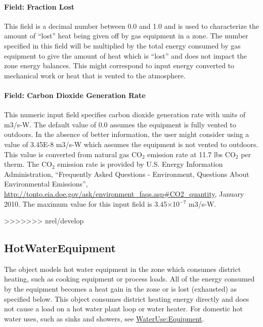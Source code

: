 \paragraph{Field: Fraction Lost}\label{field-fraction-lost-1-gas-definition}

This field is a decimal number between 0.0 and 1.0 and is used to characterize the amount of ``lost'' heat being given off by gas equipment in a zone. The number specified in this field will be multiplied by the total energy consumed by gas equipment to give the amount of heat which is ``lost'' and does not impact the zone energy balances. This might correspond to input energy converted to mechanical work or heat that is vented to the atmosphere.

\paragraph{Field: Carbon Dioxide Generation Rate}\label{field-carbon-dioxide-generation-rate-1-gas-definition}

This numeric input field specifies carbon dioxide generation rate with units of m3/s-W. The default value of 0.0 assumes the equipment is fully vented to outdoors. In the absence of better information, the user might consider using a value of 3.45E-8 m3/s-W which assumes the equipment is not vented to outdoors. This value is converted from natural gas CO\(_{2}\) emission rate at 11.7 lbs CO\(_{2}\) per therm. The CO\(_{2}\) emission rate is provided by U.S. Energy Information Administration, ``Frequently Asked Questions - Environment, Questions About Environmental Emissions'', \url{http://tonto.eia.doe.gov/ask/environment_faqs.asp#CO2_quantity}, January 2010. The maximum value for this input field is 3.45$\times$10$^{-7}$ m3/s-W.

>>>>>>> nrel/develop
\subsection{HotWaterEquipment}\label{hotwaterequipment}

The object models hot water equipment in the zone which consumes district heating, such as cooking equipment or process loads. All of the energy consumed by the equipment becomes a heat gain in the zone or is lost (exhausted) as specified below. This object consumes district heating energy directly and does not cause a load on a hot water plant loop or water heater. For domestic hot water uses, such as sinks and showers, see \hyperref[wateruseequipment]{WaterUse:Equipment}.

